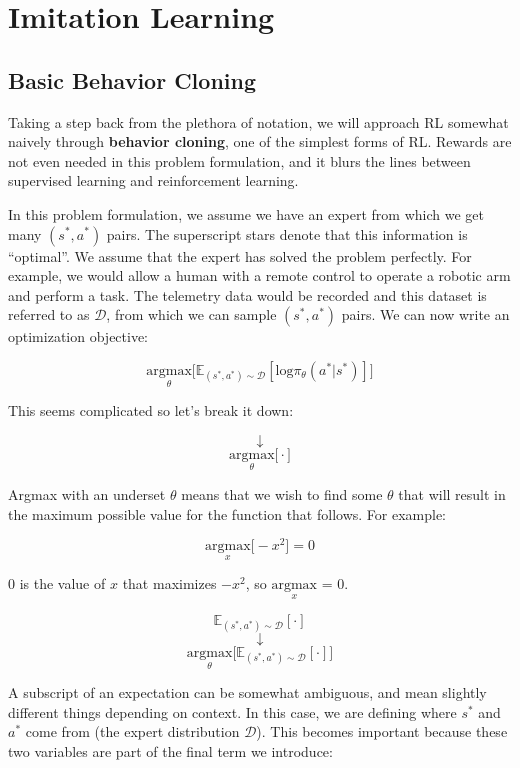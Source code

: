 \section{Imitation Learning}
\subsection{Basic Behavior Cloning}
    \large Taking a step back from the plethora of notation, we will approach RL somewhat naively through \textbf{behavior cloning}, one of the simplest forms of RL. Rewards are not even needed in this problem formulation, and it blurs the lines between supervised learning and reinforcement learning. 

    In this problem formulation, we assume we have an expert from which we get many $(s^\ast, a^\ast)$ pairs. The superscript stars denote that this information is ``optimal''. We assume that the expert has solved the problem perfectly. For example, we would allow a human with a remote control to operate a robotic arm and perform a task. The telemetry data would be recorded and this dataset is referred to as $\mathcal{D}$, from which we can sample $(s^\ast, a^\ast)$ pairs. We can now write an optimization objective:

    $$\underset{\theta}{\textrm{argmax}}\biggl[\mathbb{E}_{(s^\ast,a^\ast) \sim \mathcal{D}}[\mathrm{log}\pi_\theta(a^\ast|s^\ast)]\biggr]$$

    This seems complicated so let's break it down:

    $$\downarrow$$
    $$\underset{\theta}{\textrm{argmax}}\biggl[ \cdot \biggr]$$

    Argmax with an underset $\theta$ means that we wish to find some $\theta$ that will result in the maximum possible value for the function that follows. For example:

    $$\underset{x}{\textrm{argmax}}\biggl[-x^2\biggr] = 0$$

    0 is the value of $x$ that maximizes $-x^2$, so $\underset{x}{\textrm{argmax}}$ = 0.
    
    $$\mathbb{E}_{(s^\ast,a^\ast) \sim \mathcal{D}}[\cdot]$$
    $$\downarrow$$
    $$\underset{\theta}{\textrm{argmax}}\biggl[ \mathbb{E}_{(s^\ast,a^\ast) \sim \mathcal{D}}[\cdot] \biggr]$$

   A subscript of an expectation can be somewhat ambiguous, and mean slightly different things depending on context. In this case, we are defining where $s^\ast$ and $a^\ast$ come from (the expert distribution $\mathcal{D}$). This becomes important because these two variables are part of the final term we introduce:


